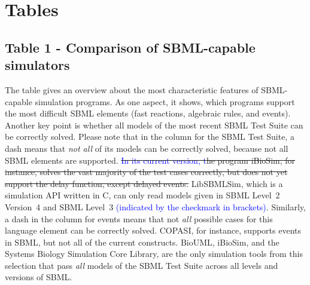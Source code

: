 \documentclass[10pt]{bmc_article}
\newenvironment{bmcformat}{\fussy\setboolean{publ}{true}}{\fussy}
\newcommand{\COR}[1]                      {\textcolor{blue}{#1}}
\newcommand{\TODO}[1]                     {\textcolor{red}{#1}}
\begin{document}
\begin{bmcformat}

\section*{Tables}

\subsection*{Table 1 - Comparison of SBML-capable simulators}
The table gives an overview about the most characteristic features of
\acs{SBML}-capable simulation programs. As one aspect, it shows, which programs
support the most difficult \acs{SBML} elements (fast reactions, algebraic rules,
and events). Another key point is whether all models of the most recent SBML Test
Suite \COR{\cite{SBMLtestSuite2013}} can be correctly solved.
Please note that in the column for the SBML Test Suite, a dash means that
\emph{not all} of its models can be correctly solved, because not all \acs{SBML}
elements are supported.
\sout{\COR{In its current version, t}he program iBioSim, for instance, solves the vast
majority of the test cases correctly, but does not yet support the delay function,
except delayed events.}
LibSBMLSim, which is a simulation \acs{API} written in C, can only read models given
in \acs{SBML} Level~2 Version~4 and \acs{SBML} Level~3
\COR{(indicated by the checkmark in brackets)}.
Similarly, a dash in the column for events means that not \emph{all} possible
cases for this language element can be correctly solved.
COPASI, for instance, supports events in \acs{SBML}, but not all of the current 
constructs.
BioUML, iBioSim, and the Systems Biology Simulation Core Library, are the 
only simulation tools from this selection that pass \emph{all} models of the
SBML Test Suite across all levels and versions of \acs{SBML}.


\end{bmcformat}
\end{document}
